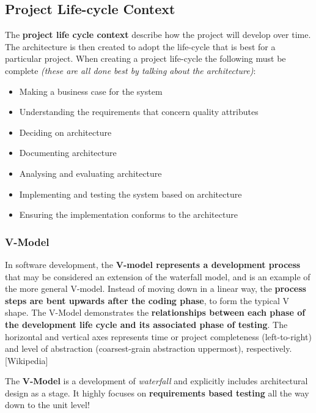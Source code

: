 \documentclass[a4paper]{article}
\begin{document}
\subsection{Project Life-cycle Context}
The \textbf{project life cycle context} describe how the project will develop over time. The architecture is then created to adopt the life-cycle that is best for a particular project. When creating a project life-cycle the following must be complete \textit{(these are all done best by talking about the architecture)}:
\begin{itemize}
\item Making a business case for the system
\item Understanding the requirements that concern quality attributes
\item Deciding on architecture
\item Documenting architecture
\item Analysing and evaluating architecture
\item Implementing and testing the system based on architecture
\item Ensuring the implementation conforms to the architecture
\end{itemize}

\subsubsection{V-Model}
In software development, the \textbf{V-model represents a development process} that may be considered an extension of the waterfall model, and is an example of the more general V-model. Instead of moving down in a linear way, the \textbf{process steps are bent upwards after the coding phase}, to form the typical V shape. The V-Model demonstrates the \textbf{relationships between each phase of the development life cycle and its associated phase of testing}. The horizontal and vertical axes represents time or project completeness (left-to-right) and level of abstraction (coarsest-grain abstraction uppermost), respectively. [Wikipedia]

The \textbf{V-Model} is a development of \textit{waterfall} and explicitly includes architectural design as a stage. It highly focuses on \textbf{requirements based testing} all the way down to the unit level!
\end{document}
